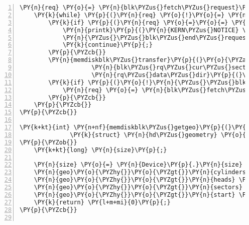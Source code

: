\begin{Verbatim}[commandchars=\\\{\},numbers=left,firstnumber=1,stepnumber=1]
	\PY{n}{req} \PY{o}{=} \PY{n}{blk\PYZus{}fetch\PYZus{}request}\PY{p}{(}\PY{n}{q}\PY{p}{)}\PY{p}{;}
	\PY{k}{while} \PY{p}{(}\PY{n}{req} \PY{o}{!}\PY{o}{=} \PY{n+nb}{NULL}\PY{p}{)} \PY{p}{\PYZob{}}
		\PY{k}{if} \PY{p}{(}\PY{n}{req} \PY{o}{=}\PY{o}{=} \PY{n+nb}{NULL} \PY{o}{|}\PY{o}{|} \PY{p}{(}\PY{n}{req}\PY{o}{\PYZhy{}}\PY{o}{\PYZgt{}}\PY{n}{cmd\PYZus{}type} \PY{o}{!}\PY{o}{=} \PY{n}{REQ\PYZus{}TYPE\PYZus{}FS}\PY{p}{)}\PY{p}{)} \PY{p}{\PYZob{}}
			\PY{n}{printk}\PY{p}{(}\PY{n}{KERN\PYZus{}NOTICE} \PY{l+s}{\PYZdq{}}\PY{l+s}{Skip non\PYZhy{}CMD request}\PY{l+s+se}{\PYZbs{}n}\PY{l+s}{\PYZdq{}}\PY{p}{)}\PY{p}{;}
			\PY{n}{\PYZus{}\PYZus{}blk\PYZus{}end\PYZus{}request\PYZus{}all}\PY{p}{(}\PY{n}{req}\PY{p}{,} \PY{o}{\PYZhy{}}\PY{n}{EIO}\PY{p}{)}\PY{p}{;}
			\PY{k}{continue}\PY{p}{;}
		\PY{p}{\PYZcb{}}
		\PY{n}{memdiskblk\PYZus{}transfer}\PY{p}{(}\PY{o}{\PYZam{}}\PY{n}{Device}\PY{p}{,} \PY{n}{blk\PYZus{}rq\PYZus{}pos}\PY{p}{(}\PY{n}{req}\PY{p}{)}\PY{p}{,}
				    \PY{n}{blk\PYZus{}rq\PYZus{}cur\PYZus{}sectors}\PY{p}{(}\PY{n}{req}\PY{p}{)}\PY{p}{,} \PY{n}{req}\PY{o}{\PYZhy{}}\PY{o}{\PYZgt{}}\PY{n}{buffer}\PY{p}{,}
				    \PY{n}{rq\PYZus{}data\PYZus{}dir}\PY{p}{(}\PY{n}{req}\PY{p}{)}\PY{p}{)}\PY{p}{;}
		\PY{k}{if} \PY{p}{(}\PY{o}{!}\PY{n}{\PYZus{}\PYZus{}blk\PYZus{}end\PYZus{}request\PYZus{}cur}\PY{p}{(}\PY{n}{req}\PY{p}{,} \PY{l+m+mi}{0}\PY{p}{)}\PY{p}{)} \PY{p}{\PYZob{}}
			\PY{n}{req} \PY{o}{=} \PY{n}{blk\PYZus{}fetch\PYZus{}request}\PY{p}{(}\PY{n}{q}\PY{p}{)}\PY{p}{;}
		\PY{p}{\PYZcb{}}
	\PY{p}{\PYZcb{}}
\PY{p}{\PYZcb{}}

\PY{k+kt}{int} \PY{n+nf}{memdiskblk\PYZus{}getgeo}\PY{p}{(}\PY{k}{struct} \PY{n}{block\PYZus{}device} \PY{o}{*}\PY{n}{block\PYZus{}device}\PY{p}{,}
		      \PY{k}{struct} \PY{n}{hd\PYZus{}geometry} \PY{o}{*}\PY{n}{geo}\PY{p}{)}
\PY{p}{\PYZob{}}
	\PY{k+kt}{long} \PY{n}{size}\PY{p}{;}

	\PY{n}{size} \PY{o}{=} \PY{n}{Device}\PY{p}{.}\PY{n}{size} \PY{o}{*} \PY{p}{(}\PY{n}{logical\PYZus{}block\PYZus{}size} \PY{o}{/} \PY{n}{KERNEL\PYZus{}SECTOR\PYZus{}SIZE}\PY{p}{)}\PY{p}{;}
	\PY{n}{geo}\PY{o}{\PYZhy{}}\PY{o}{\PYZgt{}}\PY{n}{cylinders} \PY{o}{=} \PY{p}{(}\PY{n}{size} \PY{o}{\PYZam{}} \PY{o}{\PYZti{}}\PY{l+m+mh}{0x3f}\PY{p}{)} \PY{o}{\PYZgt{}}\PY{o}{\PYZgt{}} \PY{l+m+mi}{6}\PY{p}{;}
	\PY{n}{geo}\PY{o}{\PYZhy{}}\PY{o}{\PYZgt{}}\PY{n}{heads} \PY{o}{=} \PY{l+m+mi}{4}\PY{p}{;}
	\PY{n}{geo}\PY{o}{\PYZhy{}}\PY{o}{\PYZgt{}}\PY{n}{sectors} \PY{o}{=} \PY{l+m+mi}{16}\PY{p}{;}
	\PY{n}{geo}\PY{o}{\PYZhy{}}\PY{o}{\PYZgt{}}\PY{n}{start} \PY{o}{=} \PY{l+m+mi}{0}\PY{p}{;}
	\PY{k}{return} \PY{l+m+mi}{0}\PY{p}{;}
\PY{p}{\PYZcb{}}


\end{Verbatim}
